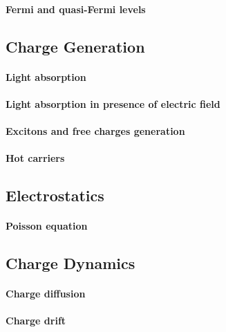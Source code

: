 		\paragraph{Fermi and quasi-Fermi levels}

	\subsection{Charge Generation}

		\paragraph{Light absorption}

		\paragraph{Light absorption in presence of electric field}\label{intro_electroabsorbance}

		\paragraph{Excitons and free charges generation}

		\paragraph{Hot carriers}

	\subsection{Electrostatics}

		\paragraph{Poisson equation}

	\subsection{Charge Dynamics}

		\paragraph{Charge diffusion}

		\paragraph{Charge drift}

